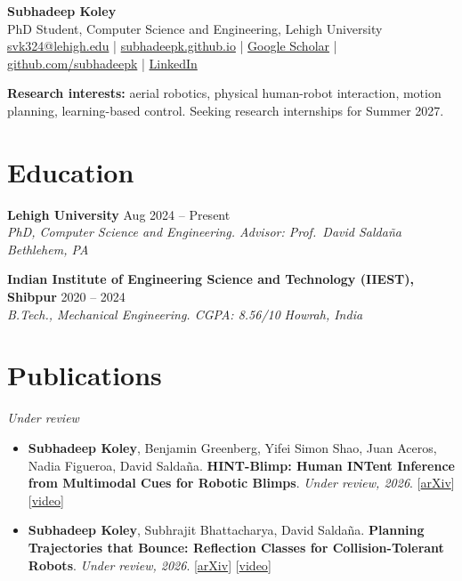 \documentclass[10pt,letterpaper]{article}
\newcommand{\entry}[4]{%
  \textbf{#1} \hfill #2 \\
  \textit{#3} \hfill \textit{#4}\par\vspace{1pt}}
\newcommand{\pub}[4]{%
  \item #1. \textbf{#2}. \textit{#3}. #4}
\newcommand{\me}{\textbf{Subhadeep Koley}}
\begin{document}
\begin{center}
  {\LARGE \textbf{Subhadeep Koley}}\\[4pt]
  PhD Student, Computer Science and Engineering, Lehigh University\\[2pt]
  \href{mailto:svk324@lehigh.edu}{svk324@lehigh.edu} \;|\;
  \href{https://subhadeepk.github.io}{subhadeepk.github.io} \;|\;
  \href{https://scholar.google.com/citations?user=_b0J6xoAAAAJ&hl=en}{Google Scholar} \;|\;
  \href{https://github.com/subhadeepk}{github.com/subhadeepk} \;|\;
  \href{https://www.linkedin.com/in/subhadeep-koley-70251b1bb/}{LinkedIn}
\end{center}

\vspace{-4pt}
\textbf{Research interests:} aerial robotics, physical human-robot interaction, motion planning,
learning-based control. Seeking research internships for Summer 2027.

\section{Education}

\entry{Lehigh University}{Aug 2024 -- Present}
      {PhD, Computer Science and Engineering. Advisor: Prof.\ David Salda\~na}{Bethlehem, PA}
\vspace{3pt}
\entry{Indian Institute of Engineering Science and Technology (IIEST), Shibpur}{2020 -- 2024}
      {B.Tech., Mechanical Engineering. CGPA: 8.56/10}{Howrah, India}

\section{Publications}

\textit{Under review}
\begin{itemize}
  \pub{\me, Benjamin Greenberg, Yifei Simon Shao, Juan Aceros, Nadia Figueroa, David Salda\~na}
      {HINT-Blimp: Human INTent Inference from Multimodal Cues for Robotic Blimps}
      {Under review, 2026}
      {[\href{https://arxiv.org/abs/2609.27154}{arXiv}] [\href{https://youtu.be/b_QbHGdgBf4}{video}]}
  \pub{\me, Subhrajit Bhattacharya, David Salda\~na}
      {Planning Trajectories that Bounce: Reflection Classes for Collision-Tolerant Robots}
      {Under review, 2026}
      {[\href{https://arxiv.org/abs/2609.27145}{arXiv}] [\href{https://youtu.be/bygwxGIbFh4}{video}]}
\end{itemize}
\end{document}

